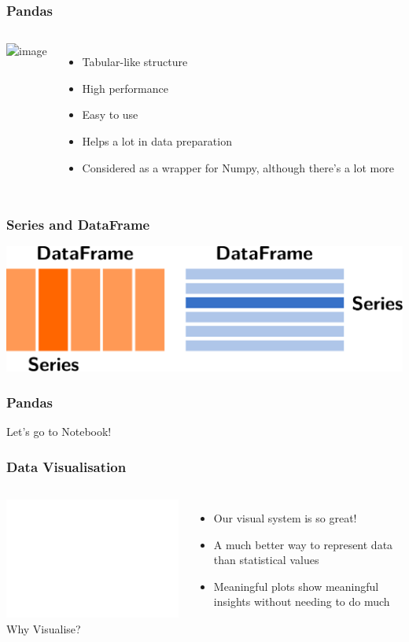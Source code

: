 \documentclass[aspectratio=169]{beamer}
\begin{document}
\begin{frame}
    \frametitle{Pandas}
    \begin{columns}
            \includegraphics<2->[width=\columnwidth]{images/pandas-logo.png}
            \begin{itemize}[<+(2)->]
                \item Tabular-like structure
                \item High performance
                \item Easy to use
                \item Helps a lot in data preparation
                \item Considered as a wrapper for Numpy, although there's a lot more
            \end{itemize}
    \end{columns}
\end{frame}

\begin{frame}
    \frametitle{Series and DataFrame}
    \includegraphics[width=\textwidth]{images/df-series.pdf}
\end{frame}

\begin{frame}
    \frametitle{Pandas}
    \centering
    { \Huge Let's go to Notebook! }
\end{frame}

\begin{frame}
    \frametitle{Data Visualisation}
    \begin{columns}
            \includegraphics<2->[width=\textwidth]{images/svm-db.pdf}
            {\large {} Why Visualise?}
            \begin{itemize}[<+(3)->]
                \item Our visual system is so great!
                \item A much better way to represent data than statistical values
                \item Meaningful plots show meaningful insights without needing to do much
            \end{itemize}
    \end{columns}
\end{frame}
\end{document}
